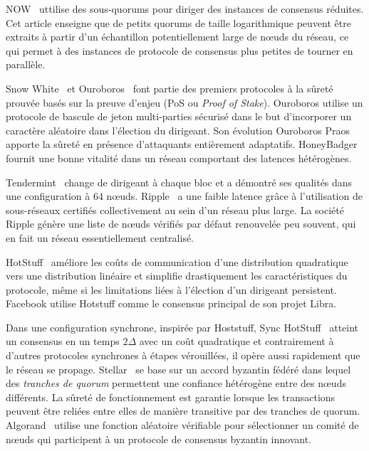 {NOW~\cite{guerraoui2013highly} uttilise des sous-quorums pour diriger des ins\-tances de consensus réduites.
Cet article enseigne que de petits quorums de taille logarithmique peuvent être extraits à partir d'un
échantillon potentiellement large de nœuds du réseau, ce qui permet à des instances de protocole de consensus plus
petites de tourner en parallèle.

Snow White~\cite{cryptoeprint:2016:919} et Ouroboros~\cite{KiayiasRDO17} font partie des premiers protocoles à la
sûreté prouvée basés sur la preuve d'enjeu (PoS ou \emph{Proof of Stake}). Ouroboros utilise un protocole de
bascule de jeton multi-parties sécurisé dans le but d'incorporer un caractère aléatoire dans l'élection du dirigeant.
Son évolution Ouroboros Praos~\cite{DavidGKR18} apporte la sûreté en présence d'attaquants entièrement adaptatifs.
HoneyBadger~\cite{MillerXCSS16} fournit une bonne vitalité dans un réseau comportant des latences hétérogènes.

Tendermint~\cite{buchman2016tendermint, 1807.04938} change de dirigeant à chaque bloc et a démontré ses qualités dans une
configuration à 64 nœuds. Ripple~\cite{schwartz2014ripple} a une faible latence grâce à l'utilisation de sous-réseaux
certifiés collectivement au sein d'un réseau plus large. La société Ripple génère une liste de nœuds vérifiés par
défaut renouvelée peu souvent, qui en fait un réseau essentiellement centralisé.

HotStuff~\cite{hotstuff,hotstuffpodc} améliore les coûts de communication d'une distribution quadratique vers une
distribution linéaire et simplifie drastiquement les caractéristiques du protocole, même si les limitations liées
à l'élection d'un dirigeant persistent. Facebook utilise Hotstuff comme le consensus principal de son projet Libra.

Dans une configuration synchrone, inspirée par Hoststuff, Sync HotStuff~\cite{synchotstuff} atteint un consensus en
un temps $2\Delta$ avec un coût quadratique et contrairement à d'autres protocoles synchrones à étapes vérouillées, il
opère aussi rapidement que le réseau se propage. Stellar~\cite{mazieres2015stellar} se base sur un accord byzantin
fédéré dans lequel des \emph{tranches de quorum} permettent une confiance hétérogène entre des nœuds différents. La
sûreté de fonctionnement est garantie lorsque les transactions peuvent être reliées entre elles de manière transitive
par des tranches de quorum. Algorand~\cite{GiladHMVZ17} utilise une fonction aléatoire vérifiable pour sélectionner un
comité de nœuds qui participent à un protocole de consensus byzantin innovant.

}
